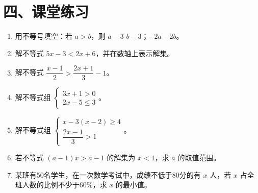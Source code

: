 \documentclass[12pt, a4paper]{ctexart}
\begin{document}
\section*{\textcolor{tipgreen}{四、课堂练习}}

\begin{enumerate}[leftmargin=2em]
  \item 用不等号填空：若 $a > b$，则 $a - 3$ \underline{\hspace{1cm}} $b - 3$；$-2a$ \underline{\hspace{1cm}} $-2b$。

  \item 解不等式 $5x - 3 < 2x + 6$，并在数轴上表示解集。

  \item 解不等式 $\dfrac{x-1}{2} > \dfrac{2x+1}{3} - 1$。

  \item 解不等式组 $\begin{cases} 3x + 1 > 0 \\ 2x - 5 \leqslant 3 \end{cases}$。

  \item 解不等式组 $\begin{cases} x - 3(x - 2) \geqslant 4 \\ \dfrac{2x-1}{3} > 1 \end{cases}$。

  \item 若不等式 $(a-1)x > a-1$ 的解集为 $x < 1$，求 $a$ 的取值范围。

  \item 某班有50名学生，在一次数学考试中，成绩不低于80分的有 $x$ 人，若 $x$ 占全班人数的比例不少于$60\%$，求 $x$ 的最小值。
\end{enumerate}

\vspace{20pt}
\end{document}
